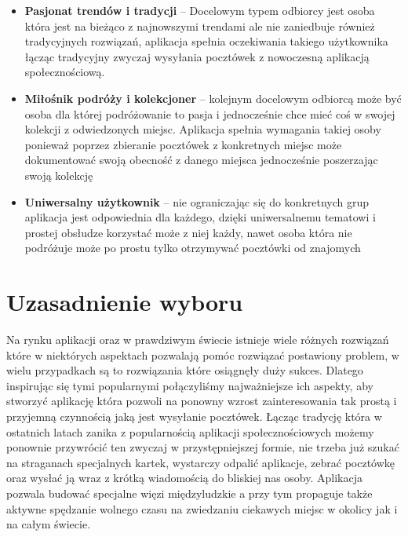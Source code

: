 \documentclass[a4paper,twoside,12pt]{book}
\begin{document}
\begin{itemize}
    \item \textbf{Pasjonat trendów i tradycji} -- Docelowym typem odbiorcy jest osoba która jest na bieżąco z najnowszymi trendami ale nie zaniedbuje również tradycyjnych rozwiązań, aplikacja spełnia oczekiwania takiego użytkownika łącząc tradycyjny zwyczaj wysyłania pocztówek z nowoczesną aplikacją społecznościową. 
    \item \textbf{Miłośnik podróży i kolekcjoner} -- kolejnym docelowym odbiorcą może być osoba dla której podróżowanie to pasja i jednocześnie chce mieć coś w swojej kolekcji z odwiedzonych miejsc. Aplikacja spełnia wymagania takiej osoby ponieważ poprzez zbieranie pocztówek z konkretnych miejsc może dokumentować swoją obecność z danego miejsca jednocześnie poszerzając swoją kolekcję
    \item \textbf{Uniwersalny użytkownik} -- nie ograniczając się do konkretnych grup aplikacja jest odpowiednia dla każdego, dzięki uniwersalnemu tematowi i prostej obsłudze korzystać może z niej każdy, nawet osoba która nie podróżuje może po prostu tylko otrzymywać pocztówki od znajomych
\end{itemize}

\section{Uzasadnienie wyboru}
Na rynku aplikacji oraz w prawdziwym świecie istnieje wiele różnych rozwiązań które w niektórych aspektach pozwalają pomóc rozwiązać postawiony problem, w wielu przypadkach są to rozwiązania które osiągnęły duży sukces. Dlatego inspirując się tymi popularnymi połączyliśmy najważniejsze ich aspekty, aby stworzyć aplikację która pozwoli na ponowny wzrost zainteresowania tak prostą i przyjemną czynnością jaką jest wysyłanie pocztówek. Łącząc tradycję która w ostatnich latach zanika z popularnością aplikacji społecznościowych możemy ponownie przywrócić ten zwyczaj w przystępniejszej formie, nie trzeba już szukać na straganach specjalnych kartek, wystarczy odpalić aplikacje, zebrać pocztówkę oraz wysłać ją wraz z krótką wiadomością do bliskiej nas osoby. Aplikacja pozwala budować specjalne więzi międzyludzkie a przy tym propaguje także aktywne spędzanie wolnego czasu na zwiedzaniu ciekawych miejsc w okolicy jak i na całym świecie.

\newpage

\end{document}
